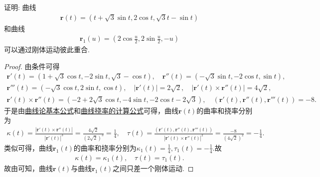 \documentclass[../../main.tex]{subfiles}%
\begin{document}
\begin{example}
证明: 曲线
\begin{align*}
\bm{r}(t) = (t + \sqrt{3} \sin t, 2 \cos t, \sqrt{3}t - \sin t)
\end{align*}
和曲线
\begin{align*}
\bm{r}_1(u) = \left(2 \cos \frac{u}{2}, 2 \sin \frac{u}{2}, -u\right)
\end{align*}
可以通过刚体运动彼此重合.
\end{example}
\begin{proof}

由条件可得
\begin{gather*}
\boldsymbol{r}'(t)=\left( 1+\sqrt{3}\cos t,-2\sin t,\sqrt{3}-\cos t \right) ,\quad \boldsymbol{r}'' (t)=\left( -\sqrt{3}\sin t,-2\cos t,\sin t \right) ,
\\
\boldsymbol{r}''' (t)=\left( -\sqrt{3}\cos t,2\sin t,\cos t \right) ,\quad \left| \boldsymbol{r}'(t) \right|=2\sqrt{2},\quad \left| \boldsymbol{r}'(t)\times \boldsymbol{r}'' (t) \right|=4\sqrt{2},
\\
\boldsymbol{r}'(t)\times \boldsymbol{r}'' (t)=\left( -2+2\sqrt{3}\cos t,-4\sin t,-2\cos t-2\sqrt{3} \right) ,\quad (\boldsymbol{r}'(t),\boldsymbol{r}'' (t),\boldsymbol{r}''' (t))=-8.
\end{gather*}
于是由\hyperref[theorem:曲线论基本公式]{曲线论基本公式}和\hyperref[theorem:微分几何-曲线挠率的计算公式]{曲线挠率的计算公式}可得，曲线$\bm{r}(t)$的曲率和挠率分别为
\begin{align*}
\kappa(t)=\frac{\left|\bm{r}'(t)\times\bm{r}''(t)\right|}{\left|\bm{r}'(t)\right|^3}=\frac{4\sqrt{2}}{(2\sqrt{2})^3}=\frac{1}{4},\quad \tau(t)=\frac{(\bm{r}'(t),\bm{r}''(t),\bm{r}'''(t))}{\left|\bm{r}'(t)\times\bm{r}''(t)\right|^2}=\frac{-8}{(4\sqrt{2})^2}=-\frac{1}{4}.
\end{align*}
类似可得，曲线$\bm{r}_1(t)$的曲率和挠率分别为$\kappa_1(t)=\frac{1}{4},\tau_1(t)=-\frac{1}{4}.$故
\begin{align*}
\kappa(t)=\kappa_1(t),\quad \tau(t)=\tau_1(t).
\end{align*}
故由可知，曲线$\bm{r}(t)$与曲线$\bm{r}_1(t)$之间只差一个刚体运动.

\end{proof}
\end{document}
